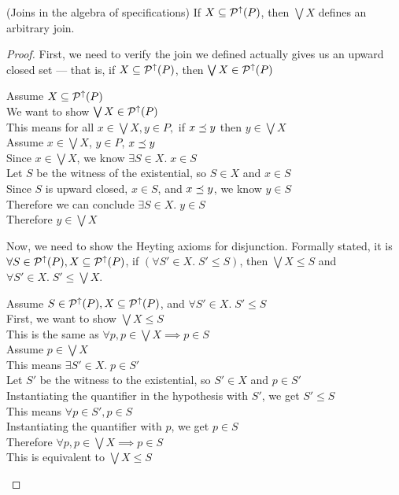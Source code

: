 \begin{lemma}{(Joins in the algebra of specifications)}
If $X \subseteq \mathcal{P}^{\uparrow}({P})$, then $\bigvee X$ defines an arbitrary join. 
\end{lemma}
\begin{proof}
First, we need to verify the join we defined actually gives us an upward closed set ---
that is, if $X \subseteq \mathcal{P}^{\uparrow}({P})$, then $\bigvee{X} \in \mathcal{P}^{\uparrow}({P})$

\vspace{0.5em}

\begin{tabbedproof}
\oo Assume  $X \subseteq \mathcal{P}^{\uparrow}({P})$ \\
\ooo We want to show $\bigvee{X} \in \mathcal{P}^{\uparrow}({P})$ \\
\ooo This means for all $x \in \bigvee{X}, y \in P,$ if $x \preceq y$ then $y \in \bigvee{X}$\\
\ooo Assume $x \in \bigvee X$, $y \in P$, $x \preceq y$ \\
\oooo Since $x \in \bigvee X$, we know $\exists S \in X.\; x \in S$ \\
\oooo Let $S$ be the witness of the existential, so $S \in X$ and $x \in S$ \\ 
\ooooo  Since $S$ is upward closed, $x \in S$, and $x \preceq y$, we know $y \in S$ \\
\ooo Therefore we can conclude $\exists S \in X.\; y \in S$ \\
\ooo Therefore $y \in \bigvee X$ \\
\end{tabbedproof}

\noindent Now, we need to show the Heyting axioms for disjunction. Formally stated, it is $\forall S \in \mathcal{P}^{\uparrow}({P}), X \subseteq
\mathcal{P}^{\uparrow}({P})$, if $(\forall S' \in X.\; S' \leq S)$, then $\bigvee X \leq
S$ and $\forall S' \in X.\; S' \leq \bigvee X$.

\vspace{0.5em}

\begin{tabbedproof}
\oo Assume $S \in \mathcal{P}^{\uparrow}({P}), X \subseteq \mathcal{P}^{\uparrow}({P})$, and $\forall S' \in X.\; S' \leq S$ \\
\ooo First, we want to show $\bigvee X \leq S$ \\
\oooo This is the same as $\forall p, p \in \bigvee X \implies p \in S$ \\
\oooo Assume $p \in \bigvee X$ \\
\ooooo This means $\exists S' \in X.\; p \in S'$ \\
\ooooo Let $S'$ be the witness to the existential, so $S' \in X$ and $p \in S'$ \\
\oooooo Instantiating the quantifier in the hypothesis with $S'$, we get $S' \leq S$ \\
\oooooo This means $\forall p \in S', p \in S$ \\
\oooooo Instantiating the quantifier with $p$, we  get $p \in S$ \\
\oooo Therefore $\forall p, p \in \bigvee X \implies p \in S$ \\
\oooo This is equivalent to $\bigvee X \leq S$ \\[1em]


\end{tabbedproof}
\end{proof}
